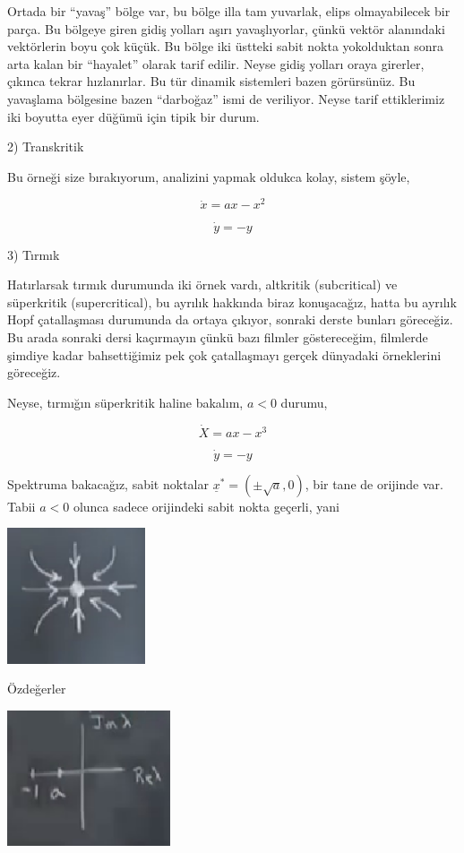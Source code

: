 \documentclass[12pt,fleqn]{article}\usepackage{../../common}
\begin{document}
Ortada bir ``yavaş'' bölge var, bu bölge illa tam yuvarlak, elips olmayabilecek
bir parça. Bu bölgeye giren gidiş yolları aşırı yavaşlıyorlar, çünkü vektör
alanındaki vektörlerin boyu çok küçük. Bu bölge iki üstteki sabit nokta
yokolduktan sonra arta kalan bir ``hayalet'' olarak tarif edilir. Neyse gidiş
yolları oraya girerler, çıkınca tekrar hızlanırlar. Bu tür dinamik sistemleri
bazen görürsünüz. Bu yavaşlama bölgesine bazen ``darboğaz'' ismi de
veriliyor. Neyse tarif ettiklerimiz iki boyutta eyer düğümü için tipik bir
durum.

2) Transkritik

Bu örneği size bırakıyorum, analizini yapmak oldukca kolay, sistem şöyle,

$$ \dot{x} = ax-x^2 $$

$$ \dot{y} = -y $$

3) Tırmık

Hatırlarsak tırmık durumunda iki örnek vardı, altkritik (subcritical) ve
süperkritik (supercritical), bu ayrılık hakkında biraz konuşacağız, hatta bu
ayrılık Hopf çatallaşması durumunda da ortaya çıkıyor, sonraki derste bunları
göreceğiz. Bu arada sonraki dersi kaçırmayın çünkü bazı filmler göstereceğim,
filmlerde şimdiye kadar bahsettiğimiz pek çok çatallaşmayı gerçek dünyadaki
örneklerini göreceğiz.

Neyse, tırmığın süperkritik haline bakalım, $a<0$ durumu,

$$ \dot{X} = ax-x^3 $$

$$ \dot{y} = -y $$

Spektruma bakacağız, sabit noktalar $\underline{x}^* = (\pm \sqrt{a}, 0)$, bir
tane de orijinde var. Tabii $a<0$ olunca sadece orijindeki sabit nokta geçerli,
yani

\includegraphics[height=4cm]{12_16.png}

Özdeğerler

\includegraphics[height=4cm]{12_17.png}
\end{document}
